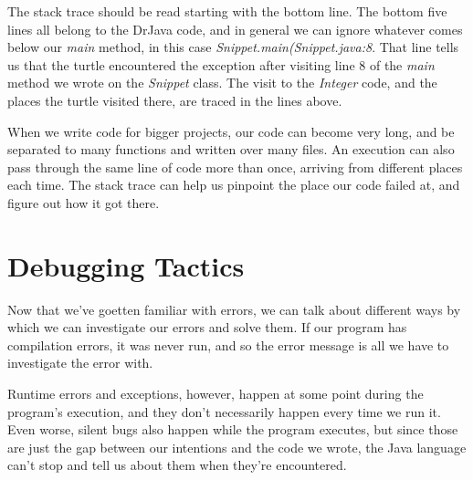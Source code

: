 The stack trace should be read starting with the bottom line. The bottom five lines all belong to the DrJava code, and in general we can ignore whatever comes below our \emph{main} method, in this case \emph{Snippet.main(Snippet.java:8}. That line tells us that the turtle encountered the exception after visiting line 8 of the \emph{main} method we wrote on the \emph{Snippet} class. The visit to the \emph{Integer} code, and the places the turtle visited there, are traced in the lines above. 

When we write code for bigger projects, our code can become very long, and be separated to many functions and written over many files. An execution can also pass through the same line of code more than once, arriving from different places each time. The stack trace can help us pinpoint the place our code failed at, and figure out how it got there.

      





\section{Debugging Tactics}

Now that we've goetten familiar with errors, we can talk about different ways by which we can investigate our errors and solve them. If our program has compilation errors, it was never run, and so the error message is all we have to investigate the error with.

Runtime errors and exceptions, however, happen at some point during the program's execution, and they don't necessarily happen every time we run it. Even worse, silent bugs also happen while the program executes, but since those are just the gap between our intentions and the code we wrote, the Java language can't stop and tell us about them when they're encountered.

